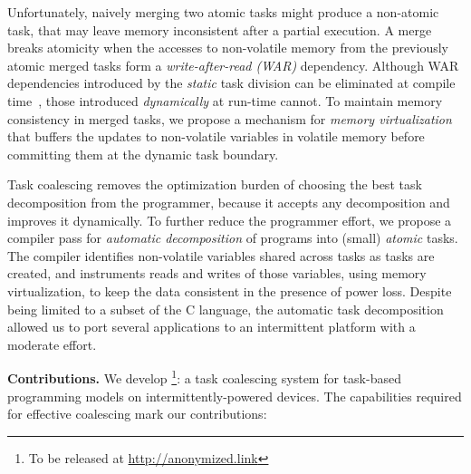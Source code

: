 Unfortunately, naively merging two atomic tasks might produce a non-atomic
task, that may leave memory inconsistent after a partial execution. A merge
breaks atomicity when the accesses to non-volatile memory from the
previously atomic merged tasks form a \emph{write-after-read (WAR)}
dependency.
%
%
Although WAR dependencies introduced by the \emph{static} task division can be eliminated at compile time~\cite{alpaca}, those introduced \emph{dynamically} at
run-time cannot. To maintain memory consistency in merged tasks, we propose a
mechanism for \emph{memory virtualization} that buffers the updates to non-volatile variables in volatile memory before committing them at the dynamic task boundary.
%

Task coalescing removes the optimization burden of choosing the best task decomposition from the programmer, because it accepts any decomposition and improves it dynamically. To further reduce the programmer effort, we propose a compiler pass for \emph{automatic decomposition} of programs into (small) \emph{atomic} tasks. The compiler identifies non-volatile variables shared across tasks as tasks are created, and instruments reads and writes of those variables, using memory virtualization, to keep the data consistent in the presence of power loss. Despite being limited to a subset of the C language, the automatic task decomposition allowed us to port several
applications to an intermittent platform with a moderate effort.

\textbf{Contributions.} We develop \sys\footnote{To be released at \url{http://anonymized.link}}: a task coalescing system for task-based programming models on intermittently-powered devices. The capabilities required for effective coalescing mark our contributions:

